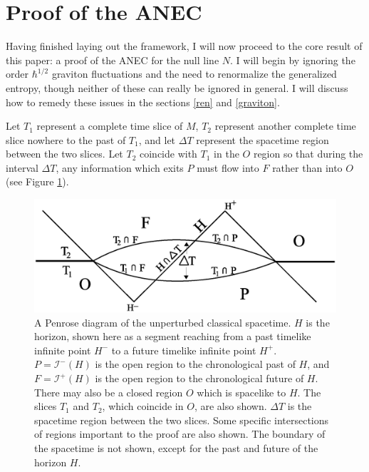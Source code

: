 \documentclass{article}
\begin{document}
\section{Proof of the ANEC}\label{proof}

Having finished laying out the framework, I will now proceed to the core result of this paper: a proof of the ANEC for the null line $N$.  I will begin by ignoring the order $\hbar^{1/2}$ graviton fluctuations and the need to renormalize the generalized entropy, though neither of these can really be ignored in general.  I will discuss how to remedy these issues in the sections \ref{ren} and \ref{graviton}.

Let $T_1$ represent a complete time slice of $M$, $T_2$ represent another complete time slice nowhere to the past of $T_1$, and let $\Delta T$ represent the spacetime region between the two slices.  Let $T_2$ coincide with $T_1$ in the $O$ region so that during the interval $\Delta T$, any information which exits $P$ must flow into $F$ rather than into $O$ (see Figure \ref{causal}).

\begin{figure}[ht]
\centering
\includegraphics[width=\textwidth]{causal.eps}
\caption{\small{A Penrose diagram of the unperturbed classical spacetime.  $H$ is the horizon, shown here as a segment reaching from a past timelike infinite point $H^-$ to a future timelike infinite point $H^+$.  $P = \mathcal{I}^-(H)$ is the open region to the chronological past of $H$, and $F = \mathcal{I}^+(H)$ is the open region to the chronological future of $H$.  There may also be a closed region $O$ which is spacelike to $H$.  The slices $T_1$ and $T_2$, which coincide in $O$, are also shown.  $\Delta T$ is the spacetime region between the two slices.  Some specific intersections of regions important to the proof are also shown.  The boundary of the spacetime is not shown, except for the past and future of the horizon $H$.}}\label{causal}
\end{figure}
\end{document}
